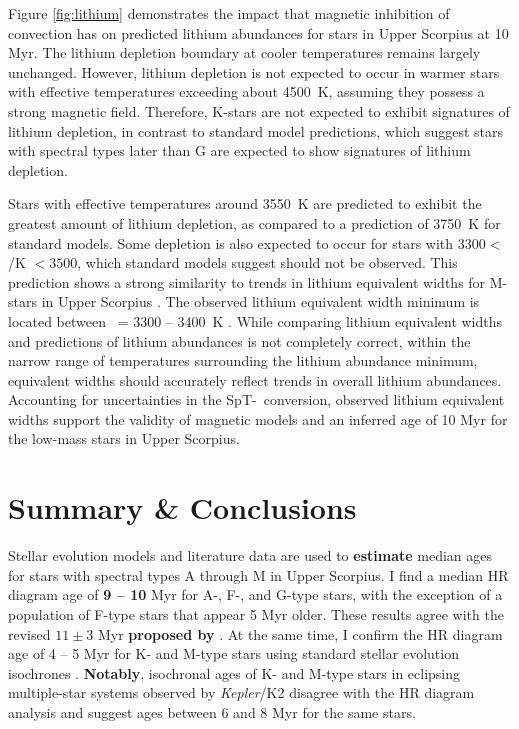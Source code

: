 \documentclass{aa}
\begin{document}
Figure \ref{fig:lithium} demonstrates the impact that magnetic inhibition of convection has on predicted lithium abundances for stars in Upper Scorpius at 10 Myr. The lithium depletion boundary at cooler temperatures remains largely unchanged. However, lithium depletion is not expected to occur in warmer stars with effective temperatures exceeding about 4500~K, assuming they possess a strong magnetic field. Therefore, K-stars are not expected to exhibit signatures of lithium depletion, in contrast to standard model predictions, which suggest stars with spectral types later than G are expected to show signatures of lithium depletion. 

Stars with effective temperatures around 3550~K are predicted to exhibit the greatest amount of lithium depletion, as compared to a prediction of 3750~K for standard models. Some depletion is also expected to occur for stars with $3300 <$ \teff/K $< 3500$, which standard models suggest should not be observed. This prediction shows a strong similarity to trends in lithium equivalent widths for M-stars in Upper Scorpius \citep{Rizzuto2015}. The observed lithium equivalent width minimum is located between \teff\ = 3300 -- 3400~K \citep{Rizzuto2015}. While comparing lithium equivalent widths and predictions of lithium abundances is not completely correct, within the narrow range of temperatures surrounding the lithium abundance minimum, equivalent widths should accurately reflect trends in overall lithium abundances. Accounting for uncertainties in the SpT-\teff\ conversion, observed lithium equivalent widths support the validity of magnetic models and an inferred age of 10 Myr for the low-mass stars in Upper Scorpius. 


\section{Summary \& Conclusions}
\label{sec:tellit}
Stellar evolution models and literature data are used to {\bf estimate} median ages for stars with spectral types A through M in Upper Scorpius. I find a median HR diagram age of {\bf 9 -- 10} Myr for A-, F-, and G-type stars, with the exception of a population of F-type stars that appear 5 Myr older. These results agree with the revised $11\pm3$ Myr {\bf proposed by} \citet{Pecaut2012}. At the same time, I confirm the HR diagram age of 4 -- 5 Myr for K- and M-type stars using standard stellar evolution isochrones \citep{Preibisch2012, Slesnick2008, Herczeg2015}. {\bf Notably}, isochronal ages of K- and M-type stars in eclipsing multiple-star systems observed by \emph{Kepler}/K2 \citep{Kraus2015, Alonso2015, David2015b} disagree with the HR diagram analysis and suggest ages between 6 and 8 Myr for the same stars.
\end{document}
